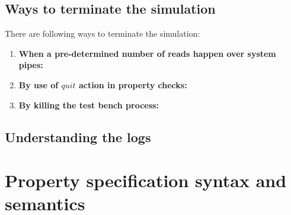 \documentclass[12pt,a4paper]{article}
\begin{document}
\subsection{Ways to terminate the simulation}

There are following ways to terminate the simulation:

\begin{enumerate}
\item \textbf{When a pre-determined number of reads happen over system pipes:}
\item \textbf{By use of $quit$ action in property checks:}
\item \textbf{By killing the test bench process:}
\end{enumerate}

\subsection{Understanding the logs}

\clearpage
\section{Property specification syntax and semantics}\label{Sec:Props}
\end{document}
